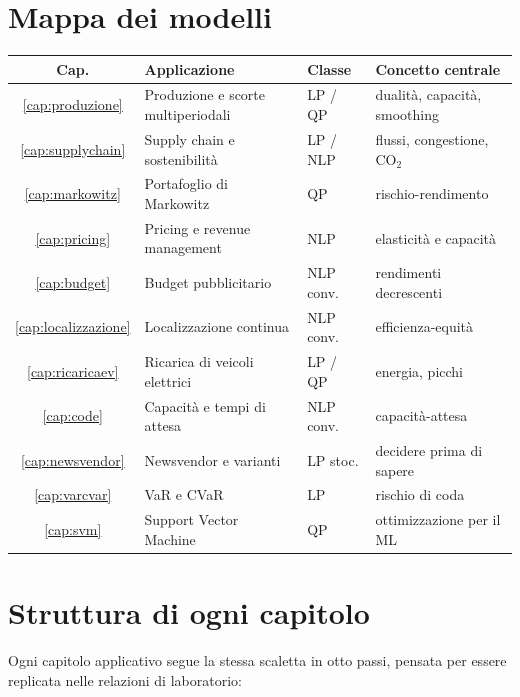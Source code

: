 \section{Mappa dei modelli}

\begin{center}\small
\begin{tabular}{clll}
\toprule
Cap. & Applicazione & Classe & Concetto centrale \\
\midrule
\ref{cap:produzione} & Produzione e scorte multiperiodali & LP / QP & dualità, capacità, smoothing \\
\ref{cap:supplychain} & Supply chain e sostenibilità & LP / NLP & flussi, congestione, CO$_2$ \\
\ref{cap:markowitz} & Portafoglio di Markowitz & QP & rischio-rendimento \\
\ref{cap:pricing} & Pricing e revenue management & NLP & elasticità e capacità \\
\ref{cap:budget} & Budget pubblicitario & NLP conv. & rendimenti decrescenti \\
\ref{cap:localizzazione} & Localizzazione continua & NLP conv. & efficienza-equità \\
\ref{cap:ricaricaev} & Ricarica di veicoli elettrici & LP / QP & energia, picchi \\
\ref{cap:code} & Capacità e tempi di attesa & NLP conv. & capacità-attesa \\
\ref{cap:newsvendor} & Newsvendor e varianti & LP stoc. & decidere prima di sapere \\
\ref{cap:varcvar} & VaR e CVaR & LP & rischio di coda \\
\ref{cap:svm} & Support Vector Machine & QP & ottimizzazione per il ML \\
\bottomrule
\end{tabular}
\end{center}

\section{Struttura di ogni capitolo}

Ogni capitolo applicativo segue la stessa scaletta in otto passi, pensata per essere
replicata nelle relazioni di laboratorio:

